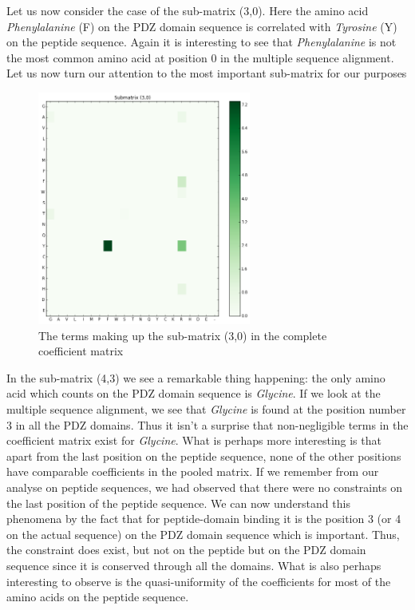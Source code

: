 \documentclass[a4paper, 12pt]{article}
\begin{document}
\begin{enumerate}
Let us now consider the case of the sub-matrix (3,0). Here the amino acid \emph{Phenylalanine} (F) on the PDZ domain sequence is correlated with \emph{Tyrosine} (Y) on the peptide sequence. Again it is interesting to see that \emph{Phenylalanine} is not the most common amino acid at position 0 in the multiple sequence alignment. Let us now turn our attention to the most important sub-matrix for our purposes

\begin{figure}[!h]
\centering
\label{submatrix_30}
\includegraphics[width=7cm]{Images/submatrix_30.png}
\caption{The terms making up the sub-matrix (3,0) in the complete coefficient matrix}
\end{figure}

In the sub-matrix (4,3) we see a remarkable thing happening: the only amino acid which counts on the PDZ domain sequence is \emph{Glycine}. If we look at the multiple sequence alignment, we see that \emph{Glycine} is found at the position number 3 in all the PDZ domains. Thus it isn't a surprise that non-negligible terms in the coefficient matrix exist for \emph{Glycine}. What is perhaps more interesting is that apart from the last position on the peptide sequence, none of the other positions have comparable coefficients in the pooled matrix. If we remember from our analyse on peptide sequences, we had observed that there were no constraints on the last position of the peptide sequence. We can now understand this phenomena by the fact that for peptide-domain binding it is the position 3 (or 4 on the actual sequence) on the PDZ domain sequence which is important. Thus, the constraint does exist, but not on the peptide but on the PDZ domain sequence since it is conserved through all the domains. What is also perhaps interesting to observe is the quasi-uniformity of the coefficients for most of the amino acids on the peptide sequence. 


\end{enumerate}
\end{document}
